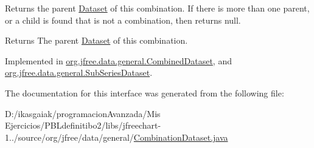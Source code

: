 Returns the parent \mbox{\hyperlink{interfaceorg_1_1jfree_1_1data_1_1general_1_1_dataset}{Dataset}} of this combination. If there is more than one parent, or a child is found that is not a combination, then returns {\ttfamily null}.

\begin{DoxyReturn}{Returns}
The parent \mbox{\hyperlink{interfaceorg_1_1jfree_1_1data_1_1general_1_1_dataset}{Dataset}} of this combination. 
\end{DoxyReturn}


Implemented in \mbox{\hyperlink{classorg_1_1jfree_1_1data_1_1general_1_1_combined_dataset_a75becba98ba679e1e4fbf9b36c77ac13}{org.\+jfree.\+data.\+general.\+Combined\+Dataset}}, and \mbox{\hyperlink{classorg_1_1jfree_1_1data_1_1general_1_1_sub_series_dataset_a0817fc414a8e775feff83818ce9a6740}{org.\+jfree.\+data.\+general.\+Sub\+Series\+Dataset}}.



The documentation for this interface was generated from the following file\+:\begin{DoxyCompactItemize}
\item 
D\+:/ikasgaiak/programacion\+Avanzada/\+Mis Ejercicios/\+P\+B\+Ldefinitibo2/libs/jfreechart-\/1../source/org/jfree/data/general/\mbox{\hyperlink{_combination_dataset_8java}{Combination\+Dataset.\+java}}\end{DoxyCompactItemize}
